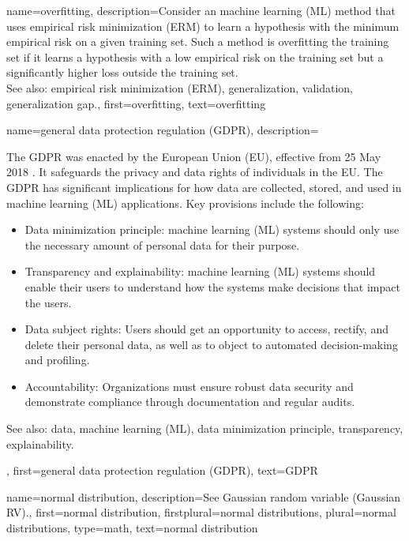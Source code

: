 {
{name={overfitting},
	description={Consider an 
		machine learning (ML) method that uses empirical risk minimization (ERM) to learn a hypothesis with the minimum empirical risk on 
		a given training set. Such a method is overfitting the training set if it learns 
		a hypothesis with a low empirical risk on the training set but a significantly higher loss outside the training set.
					\\ 
		See also: empirical risk minimization (ERM), generalization, validation, generalization gap.},
	first={overfitting},
	text={overfitting}
}

{name={general data protection regulation (GDPR)},
	description={The GDPR
			was enacted by the European Union (EU), effective from 25 May 2018 \cite{GDPR2016}. 
			It safeguards the privacy and data rights of individuals in the EU. 
			The GDPR has significant implications for how data are collected, stored, and used in machine learning (ML)  
			applications. Key provisions include the following:
			\begin{itemize}
				\item Data minimization principle: machine learning (ML) systems should only use the necessary amount of personal 
				data for their purpose.
				\item Transparency and explainability: machine learning (ML) systems should enable their users to 
				understand how the systems make decisions that impact the users.
				\item Data subject rights: Users should get an opportunity to access, rectify, and delete their personal data, as well as to object to automated decision-making and profiling.
				\item Accountability: Organizations must ensure robust data security and demonstrate 
				compliance through documentation and regular audits.
			\end{itemize}
		See also: data, machine learning (ML), data minimization principle, transparency, explainability.}, 
	first={general data protection regulation (GDPR)},
	text={GDPR}
}

{name={normal distribution}, 
 description={See Gaussian random variable (Gaussian RV).},
 first={normal distribution}, 
 firstplural={normal distributions},
 plural={normal distributions},
 type=math, 
 text={normal distribution}
}
	
}
